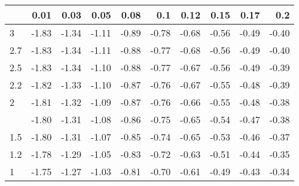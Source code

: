 
\begin{tabular}{lrrrrrrrrr}
\toprule
  & 0.01 & 0.03 & 0.05 & 0.08 & 0.1 & 0.12 & 0.15 & 0.17 & 0.2\\
\midrule
3 & -1.83 & -1.34 & -1.11 & -0.89 & -0.78 & -0.68 & -0.56 & -0.49 & -0.40\\
2.7 & -1.83 & -1.34 & -1.11 & -0.88 & -0.77 & -0.68 & -0.56 & -0.49 & -0.40\\
2.5 & -1.83 & -1.34 & -1.10 & -0.88 & -0.77 & -0.67 & -0.56 & -0.49 & -0.39\\
2.2 & -1.82 & -1.33 & -1.10 & -0.87 & -0.76 & -0.67 & -0.55 & -0.48 & -0.39\\
2 & -1.81 & -1.32 & -1.09 & -0.87 & -0.76 & -0.66 & -0.55 & -0.48 & -0.38\\
\addlinespace
1.7 & -1.80 & -1.31 & -1.08 & -0.86 & -0.75 & -0.65 & -0.54 & -0.47 & -0.38\\
1.5 & -1.80 & -1.31 & -1.07 & -0.85 & -0.74 & -0.65 & -0.53 & -0.46 & -0.37\\
1.2 & -1.78 & -1.29 & -1.05 & -0.83 & -0.72 & -0.63 & -0.51 & -0.44 & -0.35\\
1 & -1.75 & -1.27 & -1.03 & -0.81 & -0.70 & -0.61 & -0.49 & -0.43 & -0.34\\
\bottomrule
\end{tabular}
